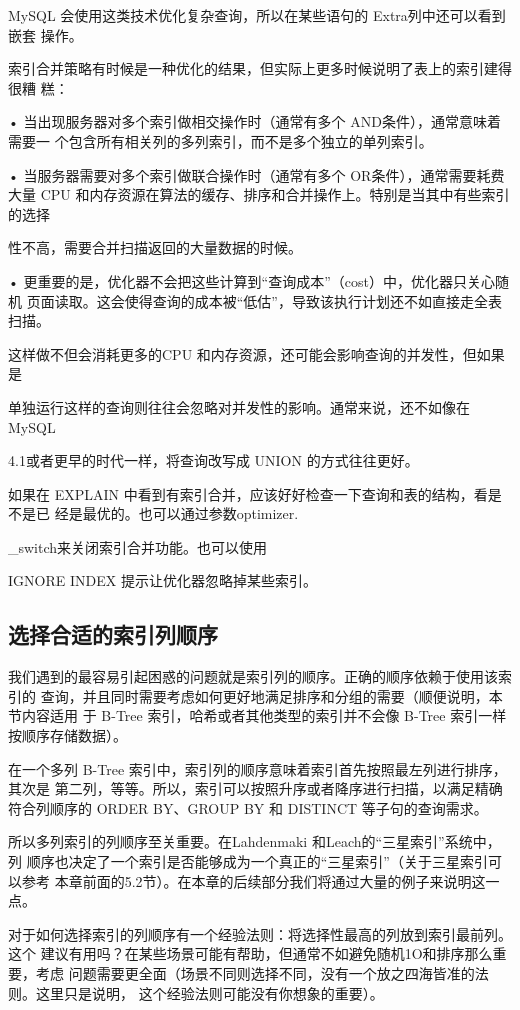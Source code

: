 MySQL 会使用这类技术优化复杂查询，所以在某些语句的 Extra列中还可以看到嵌套
操作。

索引合并策略有时候是一种优化的结果，但实际上更多时候说明了表上的索引建得很糟
糕：

• 当出现服务器对多个索引做相交操作时（通常有多个 AND条件），通常意味着需要一
个包含所有相关列的多列索引，而不是多个独立的单列索引。

• 当服务器需要对多个索引做联合操作时（通常有多个 OR条件），通常需要耗费大量
CPU 和内存资源在算法的缓存、排序和合并操作上。特别是当其中有些索引的选择

性不高，需要合并扫描返回的大量数据的时候。

• 更重要的是，优化器不会把这些计算到“查询成本”（cost）中，优化器只关心随机
页面读取。这会使得查询的成本被“低估”，导致该执行计划还不如直接走全表扫描。

这样做不但会消耗更多的CPU 和内存资源，还可能会影响查询的并发性，但如果是

单独运行这样的查询则往往会忽略对并发性的影响。通常来说，还不如像在MySQL

4.1或者更早的时代一样，将查询改写成 UNION 的方式往往更好。

如果在 EXPLAIN 中看到有索引合并，应该好好检查一下查询和表的结构，看是不是已
经是最优的。也可以通过参数optimizer.

\_switch来关闭索引合并功能。也可以使用

IGNORE INDEX 提示让优化器忽略掉某些索引。

\subsection{选择合适的索引列顺序}
我们遇到的最容易引起困惑的问题就是索引列的顺序。正确的顺序依赖于使用该索引的
查询，并且同时需要考虑如何更好地满足排序和分组的需要（顺便说明，本节内容适用
于 B-Tree 索引，哈希或者其他类型的索引并不会像 B-Tree 索引一样按顺序存储数据）。

在一个多列 B-Tree 索引中，索引列的顺序意味着索引首先按照最左列进行排序，其次是
第二列，等等。所以，索引可以按照升序或者降序进行扫描，以满足精确符合列顺序的
ORDER BY、GROUP BY 和 DISTINCT 等子句的查询需求。

所以多列索引的列顺序至关重要。在Lahdenmaki 和Leach的“三星索引”系统中，列
顺序也决定了一个索引是否能够成为一个真正的“三星索引”（关于三星索引可以参考
本章前面的5.2节）。在本章的后续部分我们将通过大量的例子来说明这一点。

对于如何选择索引的列顺序有一个经验法则：将选择性最高的列放到索引最前列。这个
建议有用吗？在某些场景可能有帮助，但通常不如避免随机1O和排序那么重要，考虑
问题需要更全面（场景不同则选择不同，没有一个放之四海皆准的法则。这里只是说明，
这个经验法则可能没有你想象的重要）。

